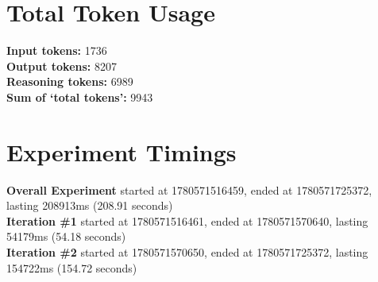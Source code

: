 \documentclass{article}
\begin{document}
\section*{Total Token Usage}
\textbf{Input tokens: }1736
\\\textbf{Output tokens: }8207
\\\textbf{Reasoning tokens: }6989
\\\textbf{Sum of `total tokens': }9943
\section*{Experiment Timings}
\textbf{Overall Experiment} started at 1780571516459, ended at 1780571725372, lasting 208913ms (208.91 seconds)
\\\textbf{Iteration \#1} started at 1780571516461, ended at 1780571570640, lasting 54179ms (54.18 seconds)
\\\textbf{Iteration \#2} started at 1780571570650, ended at 1780571725372, lasting 154722ms (154.72 seconds)
\end{document}
